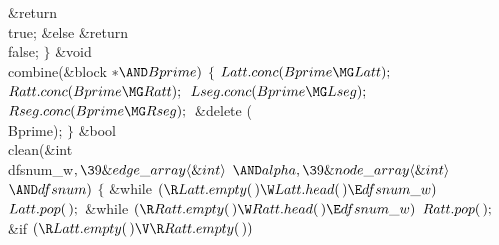 \&{return} \\{true};\2\6
\&{else}\1\5
\&{return} \\{false};\2\6
\4${}\}{}$\2\7
\&{void} \\{combine}(\&{block} ${}{*}{\AND}\\{Bprime}){}$\1\1\2\2\6
${}\{{}$\1\6
${}\\{Latt}.\\{conc}(\\{Bprime}\MG\\{Latt});{}$\6
${}\\{Ratt}.\\{conc}(\\{Bprime}\MG\\{Ratt});{}$\6
${}\\{Lseg}.\\{conc}(\\{Bprime}\MG\\{Lseg});{}$\6
${}\\{Rseg}.\\{conc}(\\{Bprime}\MG\\{Rseg});{}$\6
\&{delete} (\\{Bprime});\6
\4${}\}{}$\2\7
\&{bool} \\{clean}(\&{int} \\{dfsnum\_w}${},\39\&{edge\_array}\langle\&{int}%
\rangle{}$ ${}{\AND}\\{alpha},\39\&{node\_array}\langle\&{int}\rangle{}$ ${}{%
\AND}\\{dfsnum}){}$\1\1\2\2\6
${}\{{}$\1\6
\&{while} ${}(\R\\{Latt}.\\{empty}(\,)\W\\{Latt}.\\{head}(\,)\E\\{dfsnum%
\_w}){}$\1\5
${}\\{Latt}.\\{pop}(\,);{}$\2\6
\&{while} ${}(\R\\{Ratt}.\\{empty}(\,)\W\\{Ratt}.\\{head}(\,)\E\\{dfsnum%
\_w}){}$\1\5
${}\\{Ratt}.\\{pop}(\,);{}$\2\6
\&{if} ${}(\R\\{Latt}.\\{empty}(\,)\V\R\\{Ratt}.\\{empty}(\,)){}$\1\5
